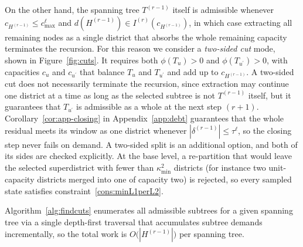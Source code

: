 \documentclass[preprint,12pt,authoryear]{elsarticle}
\theoremstyle{definition}
\begin{document}
On the other hand, the spanning tree $T^{(r-1)}$ itself is admissible whenever $c_{H^{(r-1)}} \leq c^\ell_{\max}$ and $d(H^{(r-1)}) \in I^{(r)}(c_{H^{(r-1)}})$, in which case extracting all remaining nodes as a single district that absorbs the whole remaining capacity terminates the recursion. For this reason we consider a \emph{two-sided cut} mode, shown in Figure~\hyperref[fig:4b]{\ref*{fig:cuts}}. It requires both $\phi(T_u) > 0$ and $\phi(T_{u^\prime})>0$, with capacities $c_u$ and $c_{u^\prime}$ that balance $T_u$ and $T_{u^{\prime}}$ and add up to $c_{H^{(r-1)}}$. A two-sided cut does not necessarily terminate the recursion, since extraction may continue one district at a time as long as the selected subtree is not $T^{(r-1)}$ itself, but it guarantees that $T_{u^\prime}$ is admissible as a whole at the next step $(r+1)$. Corollary~\ref{cor:app-closing} in Appendix~\ref{app:debt} guarantees that the whole residual meets its window as one district whenever $|\delta^{(r-1)}| \leq \tau^{\ell}$, so the closing step never fails on demand. A two-sided split is an additional option, and both of its sides are checked explicitly. At the base level, a re-partition that would leave the selected superdistrict with fewer than $\kappa^2_{\min}$ districts (for instance two unit-capacity districts merged into one of capacity two) is rejected, so every sampled state satisfies constraint~\eqref{cons:minL1perL2}.



Algorithm~\ref{alg:findcuts} enumerates all admissible subtrees for a given
spanning tree via a single depth-first traversal that accumulates subtree demands incrementally, so the total work is $O\bigl(|H^{(r-1)}|\bigr)$ per spanning tree.

\medskip
\medskip
\end{document}
